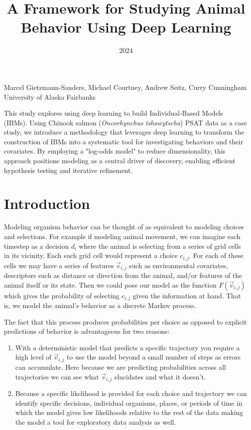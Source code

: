 \documentclass[11pt]{article}
\title{A Framework for Studying Animal Behavior Using Deep Learning}
\date{2024}
\makeatletter
\renewcommand{\maketitle}{
\begin{center}

\pagestyle{empty}

{\LARGE \bf \@title\par}
\vspace{1cm}

{\Large Marcel Gietzmann-Sanders, Michael Courtney, Andrew Seitz, Curry Cunningham}\\[1cm]

University of Alaska Fairbanks


\end{center}
}\makeatother
\makeatother
\begin{document}
\maketitle


\begin{center}
This study explores using deep learning to build Individual-Based Models (IBMs). Using Chinook salmon (\textit{Oncorhynchus tshawytscha}) PSAT data as a case study, we introduce a methodology that leverages deep learning to transform the construction of IBMs into a systematic tool for investigating behaviors and their covariates. By employing a "log-odds model" to reduce dimensionality, this approach positions modeling as a central driver of discovery, enabling efficient hypothesis testing and iterative refinement.
\end{center}



\section*{Introduction}

Modeling organism behavior can be thought of as equivalent to modeling choices and selections. For example if modeling animal movement, we can imagine each timestep as a decision $d_i$ where the animal is selecting from a series of grid cells in its vicinity. Each such grid cell would represent a choice $c_{i,j}$. For each of these cells we may have a series of features $\vec{v}_{i,j}$ such as environmental covariates, descriptors such as distance or direction from the animal, and/or features of the animal itself or its state. Then we could pose our model as the function $F(\vec{v}_{i,j})$ which gives the probability of selecting $c_{i,j}$ given the information at hand. That is, we model the animal's behavior as a discrete Markov process. 

The fact that this process produces probabilities per choice as opposed to explicit predictions of behavior is advantageous for two reasons:

\begin{enumerate}
\item With a deterministic model that predicts a specific trajectory you require a high level of $\vec{v}_{i,j}$ to use the model beyond a small number of steps as errors can accumulate. Here because we are predicting probabilities across all trajectories we can see what $\vec{v}_{i,j}$ elucidates and what it doesn't.
\item Because a specific likelihood is provided for each choice and trajectory we can identify specific decisions, individual organisms, places, or periods of time in which the model gives low likelihoods relative to the rest of the data making the model a tool for exploratory data analysis as well.
\end{enumerate}
\end{document}
